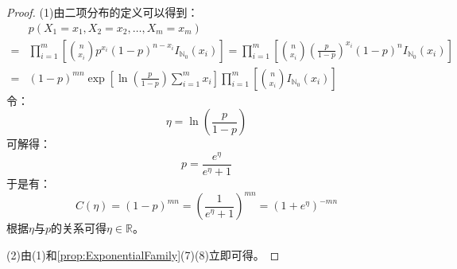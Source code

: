 \begin{proof}
	(1)由二项分布的定义可以得到：
	\begin{align*}
		&p(X_1=x_1,X_2=x_2,\dots,X_m=x_m) \\
		=&\prod_{i=1}^{m}\left[\binom{n}{x_i}p^{x_i}(1-p)^{n-x_i}I_{\mathbb{N}_0}(x_i)\right]=\prod_{i=1}^{m}\left[\binom{n}{x_i}\left(\frac{p}{1-p}\right)^{x_i}(1-p)^nI_{\mathbb{N}_0}(x_i)\right] \\
		=&(1-p)^{mn}\exp\left[\ln\left(\frac{p}{1-p}\right)\sum_{i=1}^{m}x_i\right]\prod_{i=1}^{m}\left[\binom{n}{x_i}I_{\mathbb{N}_0}(x_i)\right]
	\end{align*}
	令：
	\begin{equation*}
		\eta=\ln\left(\frac{p}{1-p}\right)
	\end{equation*}
	可解得：
	\begin{equation*}
		p=\frac{e^{\eta}}{e^{\eta}+1}
	\end{equation*}
	于是有：
	\begin{equation*}
		C(\eta)=(1-p)^{mn}=\left(\frac{1}{e^{\eta}+1}\right)^{mn}=(1+e^{\eta})^{-mn}
	\end{equation*}
	根据$\eta$与$p$的关系可得$\eta\in\mathbb{R}$。\par
	(2)由(1)和\cref{prop:ExponentialFamily}(7)(8)立即可得。
\end{proof}


